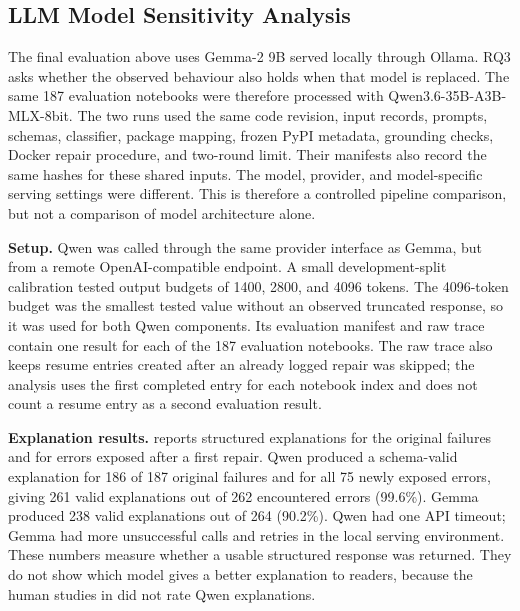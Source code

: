 \subsection{LLM Model Sensitivity Analysis}
\label{sec:v-model-sensitivity}

The final evaluation above uses Gemma-2 9B served locally through Ollama.
RQ3 asks whether the observed behaviour also holds when that model is
replaced. The same 187 evaluation notebooks were therefore processed with
Qwen3.6-35B-A3B-MLX-8bit. The two runs used the same code revision, input
records, prompts, schemas, classifier, package mapping, frozen PyPI metadata,
grounding checks, Docker repair procedure, and two-round limit. Their manifests
also record the same hashes for these shared inputs. The model, provider, and
model-specific serving settings were different. This is therefore a controlled
pipeline comparison, but not a comparison of model architecture alone.

\textbf{Setup.} Qwen was called through the same provider interface as Gemma,
but from a remote OpenAI-compatible endpoint. A small development-split
calibration tested output budgets of 1400, 2800, and 4096 tokens. The 4096-token
budget was the smallest tested value without an observed truncated response, so
it was used for both Qwen components. Its evaluation manifest and raw trace
contain one result for each of the 187 evaluation notebooks. The raw trace also keeps
resume entries created after an already logged repair was skipped; the analysis
uses the first completed entry for each notebook index and does not count a
resume entry as a second evaluation result.

\textbf{Explanation results.} 
reports structured explanations for the original failures and for errors exposed
after a first repair. Qwen produced a schema-valid explanation for 186 of 187
original failures and for all 75 newly exposed errors, giving 261 valid
explanations out of 262 encountered errors (99.6\%). Gemma produced 238 valid
explanations out of 264 (90.2\%). Qwen had one API timeout; Gemma had more
unsuccessful calls and retries in the local serving environment. These numbers
measure whether a usable structured response was returned. They do not show
which model gives a better explanation to readers, because the human studies in
 did not rate Qwen explanations.

